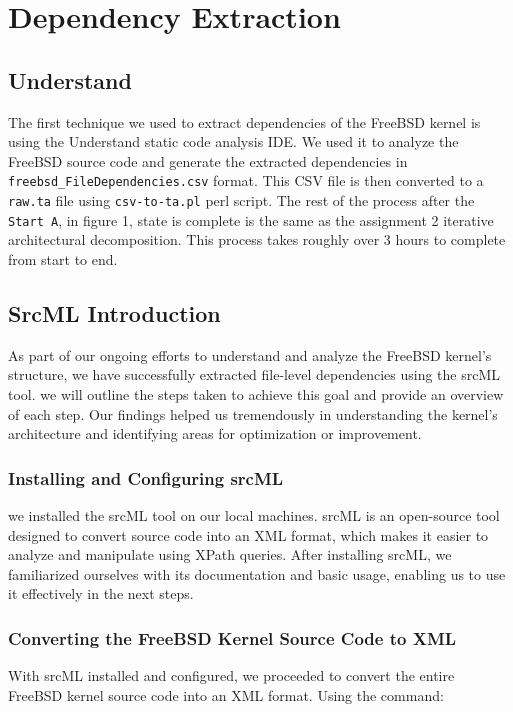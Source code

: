 \documentclass[12pt, dvipsnames, a4paper]{article}
\newcommand{\code}[1]{\texttt{#1}}
\begin{document}
\section{Dependency Extraction}
\subsection{Understand}
The first technique we used to extract dependencies of the FreeBSD kernel is using the Understand static code analysis IDE. We used it to analyze the FreeBSD source code and generate the extracted dependencies in \code{freebsd\_FileDependencies.csv} format. This CSV file is then converted to a \code{raw.ta} file using \code{csv-to-ta.pl} perl script. The rest of the process after the \code{Start A}, in figure 1, state is complete is the same as the assignment 2 iterative architectural decomposition. This process takes roughly over 3 hours to complete from start to end.


\subsection{SrcML Introduction}

As part of our ongoing efforts to understand and analyze the FreeBSD kernel's structure, we have successfully extracted file-level dependencies using the srcML tool. we will outline the steps taken to achieve this goal and provide an overview of each step. Our findings helped us tremendously in understanding the kernel's architecture and identifying areas for optimization or improvement.

\subsubsection{Installing and Configuring srcML}

we installed the srcML tool on our local machines. srcML is an open-source tool designed to convert source code into an XML format, which makes it easier to analyze and manipulate using XPath queries. After installing srcML, we familiarized ourselves with its documentation and basic usage, enabling us to use it effectively in the next steps.

\subsubsection{Converting the FreeBSD Kernel Source Code to XML}

With srcML installed and configured, we proceeded to convert the entire FreeBSD kernel source code into an XML format. Using the command:
\end{document}
